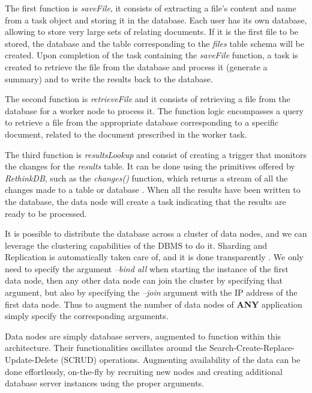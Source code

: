 \documentclass[12pt, titlepage]{uo_temp}
\begin{document}
     The first function is \emph{saveFile}, it consists of extracting a file's content and
     name from a task object and storing it in the database. Each user has its own
     database, allowing to store very large sets of relating documents. If it is the first
     file to be stored, the database and the table corresponding to the \emph{files} table
     schema will be created. Upon completion of the task containing the \emph{saveFile}
     function, a task is created to retrieve the file from the database and process it
     (generate a summary) and to write the results back to the database.
     
     The second function is \emph{retrieveFile} and it consists of retrieving a file from
     the database for a worker node to process it. The function logic encompasses a query
     to retrieve a file from the appropriate database corresponding to a specific
     document, related to the document prescribed in the worker task.
     
     The third function is \emph{resultsLookup} and consist of creating a trigger that
     monitors the changes for the \emph{results} table. It can be done using the
     primitives offered by \emph{RethinkDB}, such as the \emph{changes()} function, which
     returns a stream of all the changes made to a table or database
     \cite{rethinkdb}. When all the results have been written to the database, the data
     node will create a task indicating that the results are ready to be processed.
    
     It is possible to distribute the database across a cluster of data nodes, and we can
     leverage the clustering capabilities of the DBMS to do it. Sharding and Replication
     is automatically taken care of, and it is done transparently \cite{rethinkdb}. We
     only need to specify the argument \emph{--bind all} when starting the instance of the
     first data node, then any other data node can join the cluster by specifying that
     argument, but also by specifying the \emph{--join} argument with the IP address of
     the first data node. Thus to augment the number of data nodes of \textbf{ANY}
     application simply specify the corresponding arguments.

     Data nodes are simply database servers, augmented to function within this
     architecture. Their functionalities oscillates around the
     Search-Create-Replace-Update-Delete (SCRUD) operations. Augmenting availability of
     the data can be done effortlessly, on-the-fly by recruiting new nodes and creating
     additional database server instances using the proper arguments.
    
\end{document}

